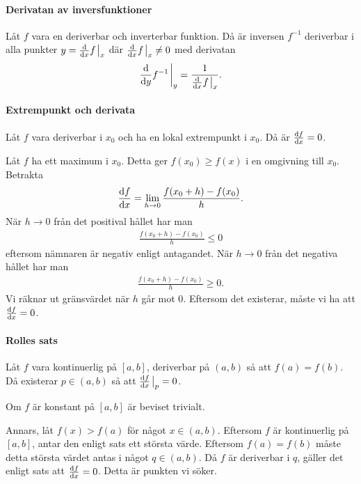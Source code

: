 \proof

\paragraph{Derivatan av inversfunktioner}
Låt $f$ vara en deriverbar och inverterbar funktion. Då är inversen $f^{-1}$ deriverbar i alla punkter $y = \dv{x}f\eval_x$ där $\dv{x}f\eval_x\neq 0$ med derivatan
\begin{align*}
	\dv{y}f^{-1}\eval_y = \frac{1}{\dv{x}f\eval_x}.
\end{align*}

\proof

\paragraph{Extrempunkt och derivata}
Låt $f$ vara deriverbar i $x_0$ och ha en lokal extrempunkt i $x_0$. Då är $\dv{f}{x} (x_0) = 0$.

\proof
Låt $f$ ha ett maximum i $x_0$. Detta ger $f(x_0)\geq f(x)$ i en omgivning till $x_0$. Betrakta
\begin{align*}
	\dv{f}{x} (x_0) = \lim\limits_{h\to 0}\frac{f(x_0 + h) - f(x_0)}{h}.
\end{align*}
När $h\to 0$ från det positival hållet har man
\begin{align*}
	\frac{f(x_0 + h) - f(x_0)}{h}\leq 0
\end{align*}
eftersom nämnaren är negativ enligt antagandet. När $h\to 0$ från det negativa hållet har man
\begin{align*}
	\frac{f(x_0 + h) - f(x_0)}{h}\geq 0.
\end{align*}
Vi räknar ut gränsvärdet när $h$ går mot $0$. Eftersom det existerar, måste vi ha att $\dv{f}{x} (x_0) = 0$.

\paragraph{Rolles sats}
Låt $f$ vara kontinuerlig på $[a, b]$, deriverbar på $(a, b)$ så att $f(a) = f(b)$. Då existerar $p\in (a, b)$ så att $\dv{f}{x}\eval_p = 0$.

\proof
Om $f$ är konstant på $[a, b]$ är beviset trivialt.

Annars, låt $f(x) > f(a)$ för något $x\in (a, b)$. Eftersom $f$ är kontinuerlig på $[a, b]$, antar den enligt sats ett största värde. Eftersom $f(a) = f(b)$ måste detta största värdet antas i något $q\in (a, b)$. Då $f$ är deriverbar i $q$, gäller det enligt sats att $\dv{f}{x} (q) = 0$. Detta är punkten vi söker.

